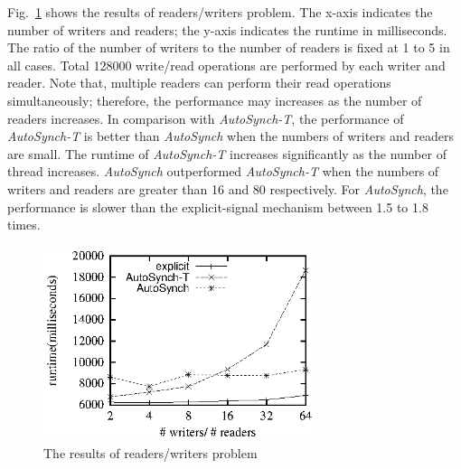 \documentclass[preprint]{sigplanconf}
\begin{document}

Fig.~\ref{fig:rw_eval} shows the results of readers/writers problem. The
x-axis indicates the number of writers and readers; the y-axis indicates the
runtime in milliseconds. The ratio of the number of writers to the number of
readers is fixed at 1 to 5 in all cases. Total 128000 write/read operations are
performed by each writer and reader. Note that, multiple readers can perform
their read operations simultaneously; therefore, the performance may increases
as the number of readers increases. In comparison with {\em AutoSynch-T}, the
performance of {\em AutoSynch-T} is better than {\em AutoSynch} when the numbers of writers
and readers are small. The runtime of {\em AutoSynch-T} increases significantly as 
the number of thread increases. {\em AutoSynch} outperformed {\em AutoSynch-T} when the
numbers of writers and readers are greater than 16 and 80 respectively. For 
{\em AutoSynch}, the performance is slower than the explicit-signal mechanism between 
1.5 to 1.8 times.


\begin{figure}[ht!]
  \centering
  \includegraphics[width=80mm]{fig/trw.eps}
  \caption{The results of readers/writers problem}
  \label{fig:rw_eval}
\end{figure}
\end{document}
